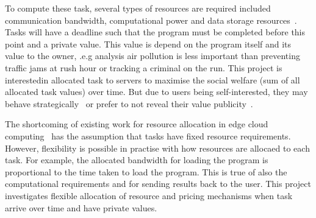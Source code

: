 To compute these task, several types of resources are required included communication bandwidth, computational power
and data storage resources~\citep{vaji_infocom}. Tasks will have a deadline such that the program must be completed
before this point and a private value. This value is depend on the program itself and its value to the owner,
.e.g analysis air pollution is less important than preventing traffic jams at rush hour or tracking a criminal on the
run. This project is interestedin allocated task to servers to maximise the social welfare (sum of all allocated
task values) over time. But due to users being self-interested, they may behave strategically~\citep{Bi2019} or prefer
to not reveal their value publicity~\citep{Pai2013}.

The shortcoming of existing work for resource allocation in edge cloud computing~\citep{vaji_infocom, Bi2019}
has the assumption that tasks have fixed resource requirements. However, flexibility is possible in practise
with how resources are allocaed to each task. For example, the allocated bandwidth for loading the program is
proportional to the time taken to load the program. This is true of also the computational requirements and
for sending results back to the user. This project investigates flexible allocation of resource and pricing
mechanisms when task arrive over time and have private values.